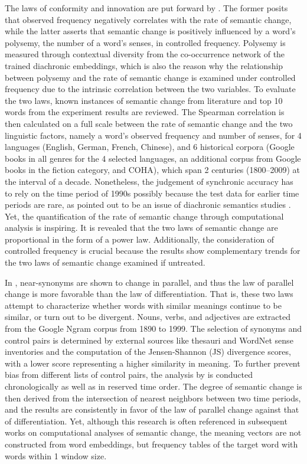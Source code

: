 The laws of conformity and innovation are put forward by \textcite{hamilton2016law}. The former posits that observed frequency negatively correlates with the rate of semantic change, while the latter asserts that semantic change is positively influenced by a word's polysemy, the number of a word's senses, in controlled frequency. Polysemy is measured through contextual diversity from the co-occurrence network of the trained diachronic embeddings, which is also the reason why the relationship between polysemy and the rate of semantic change is examined under controlled frequency due to the intrinsic correlation between the two variables. To evaluate the two laws, known instances of semantic change from literature and top 10 words from the experiment results are reviewed. The Spearman correlation is then calculated on a full scale between the rate of semantic change and the two linguistic factors, namely a word's observed frequency and number of senses, for 4 languages (English, German, French, Chinese), and 6 historical corpora (Google books in all genres for the 4 selected languages, an additional corpus from Google books in the fiction category, and COHA), which span 2 centuries (1800--2009) at the interval of a decade. Nonetheless, the judgement of synchronic accuracy has to rely on the time period of 1990s possibly because the test data for earlier time periods are rare, as pointed out to be an issue of diachronic semantics studies \parencite{wevers2020digital}. Yet, the quantification of the rate of semantic change through computational analysis is inspiring. It is revealed that the two laws of semantic change are proportional in the form of a power law. Additionally, the consideration of controlled frequency is crucial because the results show complementary trends for the two laws of semantic change examined if untreated.

In \textcite{xu2015computational}, near-synonyms are shown to change in parallel, and thus the law of parallel change is more favorable than the law of differentiation. That is, these two laws attempt to characterize whether words with similar meanings continue to be similar, or turn out to be divergent. Nouns, verbs, and adjectives are extracted from the Google Ngram corpus from 1890 to 1999. The selection of synonyms and control pairs is determined by external sources like thesauri and WordNet sense inventories and the computation of the Jensen-Shannon (JS) divergence scores, with a lower score representing a higher similarity in meaning. To further prevent bias from different lists of control pairs, the analysis by \textcite{xu2015computational} is conducted chronologically as well as in reserved time order. The degree of semantic change is then derived from the intersection of nearest neighbors between two time periods, and the results are consistently in favor of the law of parallel change against that of differentiation. Yet, although this research is often referenced in subsequent works on computational analyses of semantic change, the meaning vectors are not constructed from word embeddings, but frequency tables of the target word with words within 1 window size.

